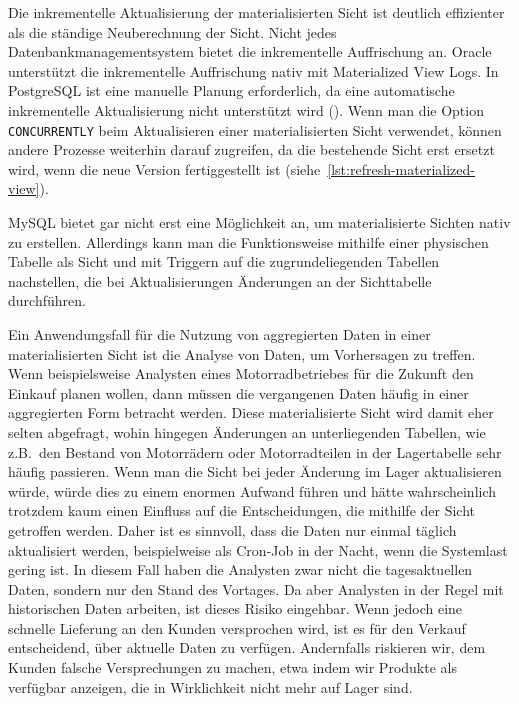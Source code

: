 Die inkrementelle Aktualisierung der materialisierten Sicht ist deutlich effizienter als die ständige Neuberechnung der Sicht.
Nicht jedes Datenbankmanagementsystem bietet die inkrementelle Auffrischung an.
Oracle unterstützt die inkrementelle Auffrischung nativ mit Materialized View Logs.
In PostgreSQL ist eine manuelle Planung erforderlich, da eine automatische inkrementelle Aktualisierung nicht unterstützt wird (\cite{mat_view_features_per_db}).
Wenn man die Option \texttt{CONCURRENTLY} beim Aktualisieren einer materialisierten Sicht verwendet, können andere Prozesse weiterhin darauf zugreifen, da die bestehende Sicht erst ersetzt wird, wenn die neue Version fertiggestellt ist (siehe~\ref{lst:refresh-materialized-view}).

MySQL bietet gar nicht erst eine Möglichkeit an, um materialisierte Sichten nativ zu erstellen.
Allerdings kann man die Funktionsweise mithilfe einer physischen Tabelle als Sicht und mit Triggern auf die zugrundeliegenden Tabellen nachstellen, die bei Aktualisierungen Änderungen an der Sichttabelle durchführen.

Ein Anwendungsfall für die Nutzung von aggregierten Daten in einer materialisierten Sicht ist die Analyse von Daten, um Vorhersagen zu treffen.
Wenn beispielsweise Analysten eines Motorradbetriebes für die Zukunft den Einkauf planen wollen, dann müssen die vergangenen Daten häufig in einer aggregierten Form betracht werden.
Diese materialisierte Sicht wird damit eher selten abgefragt, wohin hingegen Änderungen an unterliegenden Tabellen, wie z.B.\ den Bestand von Motorrädern oder Motorradteilen in der Lagertabelle sehr häufig passieren.
Wenn man die Sicht bei jeder Änderung im Lager aktualisieren würde, würde dies zu einem enormen Aufwand führen und hätte wahrscheinlich trotzdem kaum einen Einfluss auf die Entscheidungen, die mithilfe der Sicht getroffen werden.
Daher ist es sinnvoll, dass die Daten nur einmal täglich aktualisiert werden, beispielweise als Cron-Job in der Nacht, wenn die Systemlast gering ist.
In diesem Fall haben die Analysten zwar nicht die tagesaktuellen Daten, sondern nur den Stand des Vortages.
Da aber Analysten in der Regel mit historischen Daten arbeiten, ist dieses Risiko eingehbar.
Wenn jedoch eine schnelle Lieferung an den Kunden versprochen wird, ist es für den Verkauf entscheidend, über aktuelle Daten zu verfügen.
Andernfalls riskieren wir, dem Kunden falsche Versprechungen zu machen, etwa indem wir Produkte als verfügbar anzeigen, die in Wirklichkeit nicht mehr auf Lager sind.

